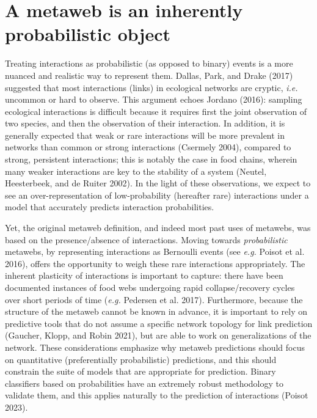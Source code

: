 \documentclass[
  letterpaper,
  DIV=11,
  numbers=noendperiod]{scrartcl}
\begin{document}
\hypertarget{a-metaweb-is-an-inherently-probabilistic-object}{%
\section{A metaweb is an inherently probabilistic
object}\label{a-metaweb-is-an-inherently-probabilistic-object}}

Treating interactions as probabilistic (as opposed to binary) events is
a more nuanced and realistic way to represent them. Dallas, Park, and
Drake (2017) suggested that most interactions (links) in ecological
networks are cryptic, \emph{i.e.} uncommon or hard to observe. This
argument echoes Jordano (2016): sampling ecological interactions is
difficult because it requires first the joint observation of two
species, and then the observation of their interaction. In addition, it
is generally expected that weak or rare interactions will be more
prevalent in networks than common or strong interactions (Csermely
2004), compared to strong, persistent interactions; this is notably the
case in food chains, wherein many weaker interactions are key to the
stability of a system (Neutel, Heesterbeek, and de Ruiter 2002). In the
light of these observations, we expect to see an over-representation of
low-probability (hereafter rare) interactions under a model that
accurately predicts interaction probabilities.

Yet, the original metaweb definition, and indeed most past uses of
metawebs, was based on the presence/absence of interactions. Moving
towards \emph{probabilistic} metawebs, by representing interactions as
Bernoulli events (see \emph{e.g.} Poisot et al. 2016), offers the
opportunity to weigh these rare interactions appropriately. The inherent
plasticity of interactions is important to capture: there have been
documented instances of food webs undergoing rapid collapse/recovery
cycles over short periods of time (\emph{e.g.} Pedersen et al. 2017).
Furthermore, because the structure of the metaweb cannot be known in
advance, it is important to rely on predictive tools that do not assume
a specific network topology for link prediction (Gaucher, Klopp, and
Robin 2021), but are able to work on generalizations of the network.
These considerations emphasize why metaweb predictions should focus on
quantitative (preferentially probabilistic) predictions, and this should
constrain the suite of models that are appropriate for prediction.
Binary classifiers based on probabilities have an extremely robust
methodology to validate them, and this applies naturally to the
prediction of interactions (Poisot 2023).
\end{document}
